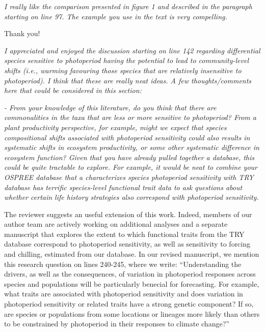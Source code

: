 \documentclass{article}
\begin{document}
\par \emph{I really like the comparison presented in figure 1 and described in the paragraph starting on line 97. The example you use in the text is very compelling. }
\par Thank you!
\par \emph{I appreciated and enjoyed the discussion starting on line 142 regarding differential species sensitive to photoperiod having the potential to lead to community-level shifts (i.e., warming favouring those species that are relatively insensitive to photoperiod). I think that these are really neat ideas. A few thoughts/comments here that could be considered in this section: }
\par \emph{- From your knowledge of this literature, do you think that there are commonalities in the taxa that are less or more sensitive to photoperiod? From a plant productivity perspective, for example, might we expect that species compositional shifts associated with photoperiod sensitivity could also results in systematic shifts in ecosystem productivity, or some other systematic difference in ecosystem function? Given that you have already pulled together a database, this could be quite tractable to explore. For example, it would be neat to combine your OSPREE database that a characterizes species photoperiod sensitivity with TRY database has terrific species-level functional trait data to ask questions about whether certain life history strategies also correspond with photoperiod sensitivity. }
\par The reviewer suggests an useful extension of this work. Indeed, members of our author team are actively working on additional analyses and a separate manuscript that explores the extent to which functional traits from the TRY database correspond to photoperiod sensitivity, as well as sensitivity to forcing and chilling, estimated from our database. In our revised manuscript, we mention this research question on lines 240-245, where we write:
``Understanding the drivers, as well as the consequences, of variation in photoperiod responses across species and populations will be particularly benecial for forecasting. For example, what traits are associated with photoperiod sensitivity and does variation in photoperiod sensitivity or related traits have a strong genetic component? If so, are species or populations from some locations or lineages more likely than others to be constrained by photoperiod in their responses to climate change?''
\end{document}
